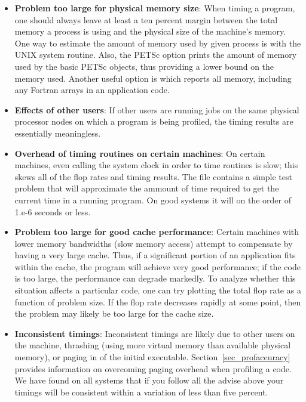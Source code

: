 {{\begin{itemize}
\item {\bf Problem too large for physical memory size}: When timing a program, one
      should always leave at least a ten percent margin between the total
      memory a process is using and the physical size of
      the machine's memory. One way to estimate the amount of
      memory used by given process is with the UNIX  system routine.
      Also, the PETSc option  prints the amount of
      memory used by the basic PETSc objects, thus providing a lower
      bound on the memory used.  Another useful option is 
      which reports all memory, including any Fortran arrays in an
      application code.
\item {\bf Effects of other users}:  If other users are running
      jobs on the same physical processor nodes on which a program is being profiled,
      the timing results are essentially meaningless.
\item {\bf Overhead of timing routines on certain machines}: On certain machines,
      even calling the system clock in order to time routines is
      slow; this skews all of the flop rates and timing results. The file
       contains a
      simple test problem that will approximate the ammount of time
      required to get the current time in a running program. On good
      systems it will on the order of 1.e-6 seconds or less.
\item {\bf Problem too large for good cache performance}: Certain machines
      with lower memory bandwidths (slow memory access) attempt to
      compensate by having a very large cache.  Thus, if a significant
      portion of an application fits within the cache, the program will achieve very
      good performance; if the code is too large, the performance can degrade markedly.
      To analyze whether this situation affects a particular code, one can
      try plotting the total flop rate as a function of problem
      size.  If the flop rate decreases rapidly at some point, then the
      problem may likely be too large for the cache size.
\item {\bf Inconsistent timings}:  Inconsistent timings are likely due to other
      users on the machine, thrashing (using more virtual memory than available
      physical memory), or paging in of the initial executable.
      Section~\ref{sec_profaccuracy} provides information on overcoming paging
      overhead when profiling a code. We have found on all systems that if you
      follow all the advise above your timings will be consistent within a variation
      of less than five percent.
\end{itemize}

}}

